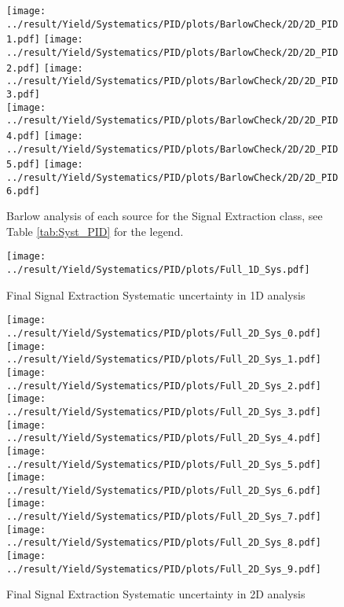 \begin{figure}
	\centering
		\texttt{[image: ../result/Yield/Systematics/PID/plots/BarlowCheck/2D/2D\_PID1.pdf]}
		\texttt{[image: ../result/Yield/Systematics/PID/plots/BarlowCheck/2D/2D\_PID2.pdf]}
		\texttt{[image: ../result/Yield/Systematics/PID/plots/BarlowCheck/2D/2D\_PID3.pdf]}\\
		\texttt{[image: ../result/Yield/Systematics/PID/plots/BarlowCheck/2D/2D\_PID4.pdf]}
		\texttt{[image: ../result/Yield/Systematics/PID/plots/BarlowCheck/2D/2D\_PID5.pdf]}
		\texttt{[image: ../result/Yield/Systematics/PID/plots/BarlowCheck/2D/2D\_PID6.pdf]}
		\caption{Barlow analysis of each source for the Signal Extraction class, see Table \ref{tab:Syst_PID} for the legend.}
		\label{fig:Barlow_PID_2D}
\end{figure}

\begin{figure}
	\centering
		\texttt{[image: ../result/Yield/Systematics/PID/plots/Full\_1D\_Sys.pdf]}
		\caption{Final Signal Extraction Systematic uncertainty in 1D analysis}
		\label{}
\end{figure}

\begin{figure}
	\centering
		\texttt{[image: ../result/Yield/Systematics/PID/plots/Full\_2D\_Sys\_0.pdf]}
		\texttt{[image: ../result/Yield/Systematics/PID/plots/Full\_2D\_Sys\_1.pdf]}
		\texttt{[image: ../result/Yield/Systematics/PID/plots/Full\_2D\_Sys\_2.pdf]}\\
		\texttt{[image: ../result/Yield/Systematics/PID/plots/Full\_2D\_Sys\_3.pdf]}
		\texttt{[image: ../result/Yield/Systematics/PID/plots/Full\_2D\_Sys\_4.pdf]}
		\texttt{[image: ../result/Yield/Systematics/PID/plots/Full\_2D\_Sys\_5.pdf]}\\
		\texttt{[image: ../result/Yield/Systematics/PID/plots/Full\_2D\_Sys\_6.pdf]}
		\texttt{[image: ../result/Yield/Systematics/PID/plots/Full\_2D\_Sys\_7.pdf]}
		\texttt{[image: ../result/Yield/Systematics/PID/plots/Full\_2D\_Sys\_8.pdf]}\\
		\texttt{[image: ../result/Yield/Systematics/PID/plots/Full\_2D\_Sys\_9.pdf]}
		\caption{Final Signal Extraction Systematic uncertainty in 2D analysis}
		\label{}
\end{figure}

